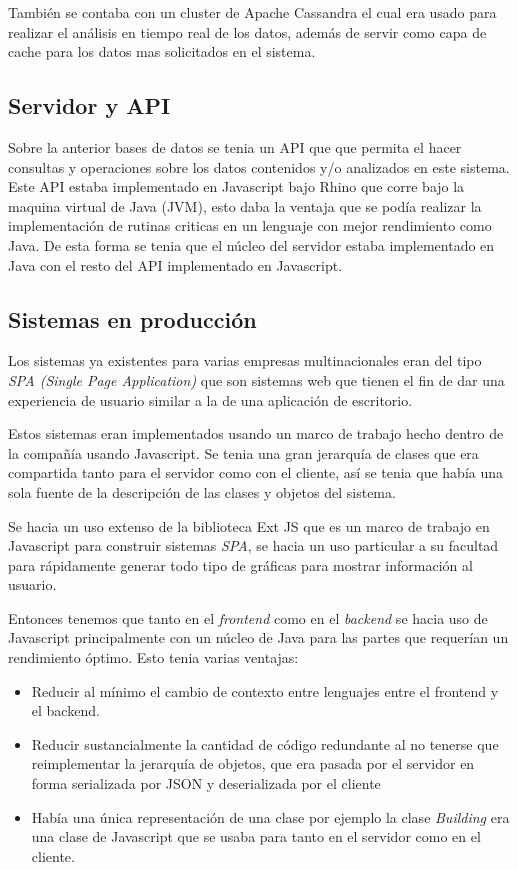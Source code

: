 También se contaba con un cluster de Apache Cassandra el cual era usado
para realizar el análisis en tiempo real de los datos, además de servir
como capa de cache para los datos mas solicitados en el sistema.

\subsection{Servidor y API}
Sobre la anterior bases de datos se tenia un API que que permita el
hacer consultas y operaciones sobre los datos contenidos y/o analizados
en este sistema. Este API estaba implementado en Javascript bajo Rhino
que corre bajo la maquina virtual de Java (JVM), esto daba la ventaja
que se podía realizar la implementación de rutinas criticas en un
lenguaje con mejor rendimiento como Java. De esta forma se tenia que el
núcleo del servidor estaba implementado en Java con el resto del API
implementado en Javascript.

\subsection{Sistemas en producción}
Los sistemas ya existentes para varias empresas multinacionales
eran del tipo \textit{SPA (Single Page Application)} que son sistemas web
que tienen el fin de dar una experiencia de usuario similar a la
de una aplicación de escritorio.

Estos sistemas eran implementados usando un marco de trabajo hecho dentro
de la compañía usando Javascript. Se tenia una gran jerarquía de clases
que era compartida tanto para el servidor como con el cliente,
así se tenia que había una sola fuente de la descripción
de las clases y objetos del sistema.

Se hacia un uso extenso de la biblioteca Ext JS que es un marco de trabajo
en Javascript para construir sistemas \textit{SPA}, se hacia un uso particular
a su facultad para rápidamente generar todo tipo de gráficas para mostrar
información al usuario.

Entonces tenemos que tanto en el \textit{frontend} como en el \textit{backend}
se hacia uso de Javascript principalmente con un núcleo de Java para las partes
que requerían un rendimiento óptimo. Esto tenia varias ventajas:

\begin{itemize}
\item Reducir al mínimo el cambio de contexto entre lenguajes entre
  el frontend y el backend.
\item Reducir sustancialmente la cantidad de código redundante al no
  tenerse que reimplementar la jerarquía de objetos, que era pasada
  por el servidor en forma serializada por JSON y deserializada por el
  cliente
\item Había una única representación de una clase por ejemplo la
  clase \textit{Building} era una clase de Javascript que se usaba para
  tanto en el servidor como en el cliente.
\end{itemize}

